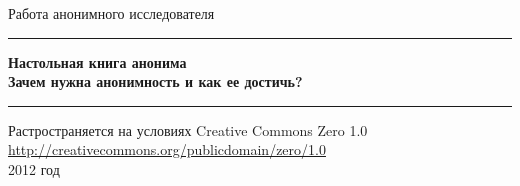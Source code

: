 \begin{titlepage}

\begin{center}
Работа анонимного исследователя
\vspace{10em}

\rule{\linewidth}{0.5mm}
\LARGE \textbf{Настольная книга анонима}\\
\Large \textbf{Зачем нужна анонимность и как ее достичь?}
\rule{\linewidth}{0.5mm}
\vfill
\normalsize Растространяется на условиях Creative Commons Zero 1.0\\
\url{http://creativecommons.org/publicdomain/zero/1.0}\\
2012 год
\end{center}

\end{titlepage}